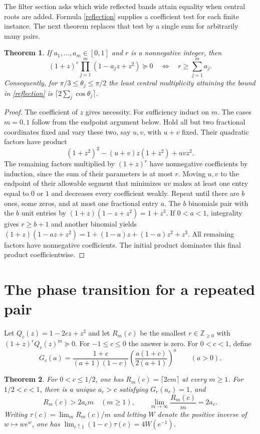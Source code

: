 \documentclass[11pt]{article}
\newtheorem{theorem}{Theorem}
\newcommand{\coef}{\succeq 0}
\begin{document}
The filter section asks which wide reflected bands attain equality when central roots are added. Formula \eqref{reflection} supplies a coefficient test for each finite instance. The next theorem replaces that test by a single sum for arbitrarily many pairs.

\begin{theorem}\label{finite}
If $a_1,\ldots,a_m\in[0,1]$ and $r$ is a nonnegative integer, then
\[
 (1+z)^r\prod_{j=1}^m(1-a_jz+z^2)\coef
 \quad\Longleftrightarrow\quad r\ge\sum_{j=1}^m a_j.
\]
Consequently, for $\pi/3\le\theta_j\le\pi/2$ the least central multiplicity attaining the bound in \eqref{reflection} is $\lceil2\sum_j\cos\theta_j\rceil$.
\end{theorem}
\begin{proof}
The coefficient of $z$ gives necessity. For sufficiency induct on $m$. The cases $m=0,1$ follow from the endpoint argument below. Hold all but two fractional coordinates fixed and vary these two, say $u,v$, with $u+v$ fixed. Their quadratic factors have product
\[
 (1+z^2)^2-(u+v)z(1+z^2)+uvz^2.
\]
The remaining factors multiplied by $(1+z)^r$ have nonnegative coefficients by induction, since the sum of their parameters is at most $r$. Moving $u,v$ to the endpoint of their allowable segment that minimizes $uv$ makes at least one entry equal to $0$ or $1$ and decreases every coefficient weakly. Repeat until there are $b$ ones, some zeros, and at most one fractional entry $a$. The $b$ binomials pair with the $b$ unit entries by $(1+z)(1-z+z^2)=1+z^3$. If $0<a<1$, integrality gives $r\ge b+1$ and another binomial yields
$(1+z)(1-az+z^2)=1+(1-a)z+(1-a)z^2+z^3$. All remaining factors have nonnegative coefficients. The initial product dominates this final product coefficientwise.
\end{proof}

\section{The phase transition for a repeated pair}

Let $Q_c(z)=1-2cz+z^2$ and let $R_m(c)$ be the smallest $r\in\mathbb Z_{\ge0}$ with $(1+z)^rQ_c(z)^m\coef$. For $-1\le c\le0$ the answer is zero. For $0<c<1$, define
\[
 G_c(a)=\frac{1+c}{(a+1)(1-c)}
     \left(\frac{a(1+c)}{2(a+1)}\right)^a \qquad(a>0).
\]
\begin{theorem}\label{phase}
For $0<c\le1/2$, one has $R_m(c)=\lceil 2cm\rceil$ at every $m\ge1$. For $1/2<c<1$, there is a unique $a_c>c$ satisfying $G_c(a_c)=1$, and
\[
 R_m(c)>2a_cm\quad(m\ge1),\qquad
 \lim_{m\to\infty}\frac{R_m(c)}m=2a_c.
\]
Writing $\tau(c)=\lim_m R_m(c)/m$ and letting $W$ denote the positive inverse of $w\mapsto we^w$, one has
$\lim_{c\uparrow1}(1-c)\tau(c)=4W(e^{-1})$.
\end{theorem}
\end{document}
